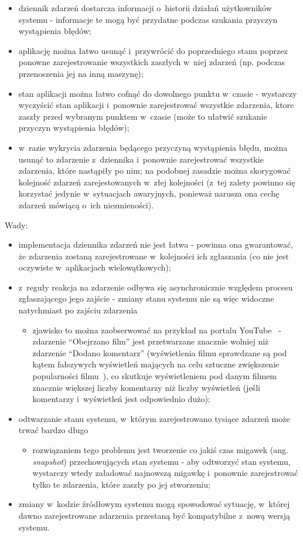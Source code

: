 \begin{itemize}
 \item dziennik zdarzeń dostarcza informacji o~historii działań użytkowników systemu - informacje te mogą być przydatne podczas szukania przyczyn wystąpienia błędów;
 \item aplikację można łatwo usunąć i~przywrócić do poprzedniego stanu poprzez ponowne zarejestrowanie wszystkich zaszłych w~niej zdarzeń (np. podczas przenoszenia jej na inną maszynę);
 \item stan aplikacji można łatwo cofnąć do dowolnego punktu w~czasie - wystarczy wyczyścić stan aplikacji i~ponownie zarejestrować wszystkie zdarzenia, ktore zaszły przed wybranym punktem w~czasie (może to ułatwić szukanie przyczyn wystąpienia błędów);
 \item w~razie wykrycia zdarzenia będącego przyczyną wystąpienia błędu, można usunąć to zdarzenie z~dziennika i~ponownie zarejestrować wszystkie zdarzenia, które nastąpiły po nim; na podobnej zasadzie można skorygować kolejność zdarzeń zarejestowanych w~złej kolejności (z~tej zalety powinno się korzystać jedynie w~sytuacjach awaryjnych, ponieważ narusza ona cechę zdarzeń mówiącą o~ich niezmieności).
\end{itemize}

Wady:

\begin{itemize}
 \item implementacja dziennika zdarzeń nie jest łatwa - powinna ona gwarantować, że zdarzenia zostaną zarejestrowane w~kolejności ich zgłaszania (co nie jest oczywiste w~aplikacjach wielowątkowych);
 \item z~reguły reakcja na zdarzenie odbywa się asynchronicznie względem procesu zgłaszającego jego zajście - zmiany stanu systemu nie są więc widoczne natychmiast po zajściu zdarzenia
  \begin{itemize}
   \item zjawisko to można zaobserwować na przykład na portalu YouTube~\cite{youtube} - zdarzenie ``Obejrzano film'' jest przetwarzane znacznie wolniej niż zdarzenie ``Dodano komentarz'' (wyświetlenia filmu sprawdzane są pod kątem fałszywych wyświetleń mających na celu sztuczne zwiększenie popularności filmu~\cite{youtube:301}), co skutkuje wyświetleniem pod danym filmem znacznie większej liczby komentarzy niż liczby wyświetleń (jeśli komentarzy i~wyświetleń jest odpowiednio dużo);
  \end{itemize}
 \item odtwarzanie stanu systemu, w~którym zarejestrowano tysiące zdarzeń może trwać bardzo długo
  \begin{itemize}
   \item rozwiązaniem tego problemu jest tworzenie co jakiś czas migawek (ang. \emph{snapshot}) przechowujących stan systemu - aby odtworzyć stan systemu, wystarczy wtedy załadować najnowszą migawkę i~ponownie zarejestrować tylko te zdarzenia, które zaszły po jej stworzeniu;
  \end{itemize}
 \item zmiany w~kodzie źródłowym systemu mogą spowodować sytuację, w~której dawno zarejestrowane zdarzenia przestaną być kompatybilne z~nową wersją systemu.
\end{itemize}


